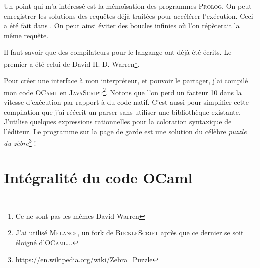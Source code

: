 \documentclass{article}
\begin{document}
Un point qui m'a intéressé est la mémoïsation des programmes \textsc{Prolog}. On peut enregistrer les solutions des requêtes déjà traitées pour accélérer l'exécution. Ceci a été fait dans \cite{Warren}. On peut ainsi éviter des boucles infinies où l'on répèterait la même requête.

Il faut savoir que des compilateurs pour le langange ont déjà été écrits. Le premier a été celui de David H. D. Warren\footnote{Ce ne sont pas les mêmes David Warren}.

Pour créer une interface à mon interpréteur, et pouvoir le partager, j'ai compilé mon code \textsc{OCaml} en \textsc{JavaScript}\footnote{J'ai utilisé \textsc{Melange}, un fork de \textsc{BuckleScript} après que ce dernier se soit éloigné d'\textsc{OCaml}...}. Notons que l'on perd un facteur 10 dans la vitesse d'exécution par rapport à du code natif. C'est aussi pour simplifier cette compilation que j'ai réécrit un parser sans utiliser une bibliothèque existante. J'utilise quelques expressions rationnelles pour la coloration syntaxique de l'éditeur. Le programme sur la page de garde est une solution du célèbre \emph{puzzle du zèbre}\footnote{\url{https://en.wikipedia.org/wiki/Zebra_Puzzle}} !




\appendix

\section*{Intégralité du code OCaml}
\inputminted{ocaml}{../Code/prolog.ml}
\end{document}
